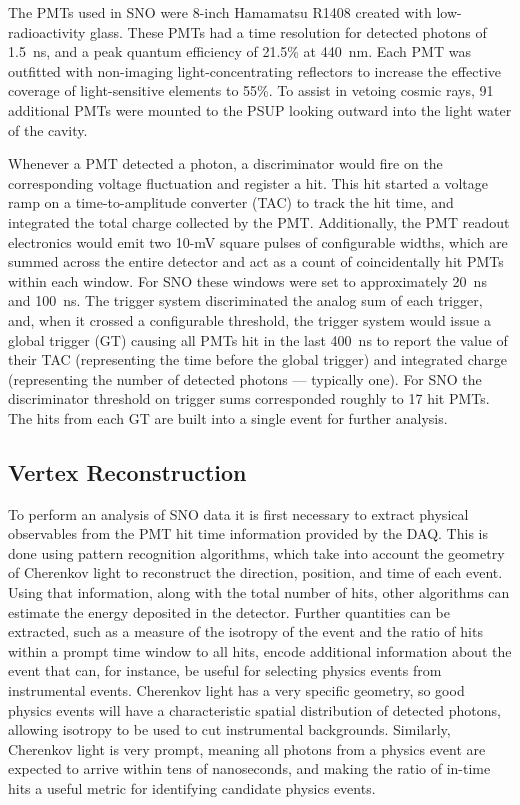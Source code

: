 The PMTs used in SNO were 8-inch Hamamatsu R1408 created with low-radioactivity glass. 
These PMTs had a time resolution for detected photons of 1.5~ns, and a peak quantum efficiency of 21.5\% at 440~nm.
Each PMT was outfitted with non-imaging light-concentrating reflectors to increase the effective coverage of light-sensitive elements to 55\%.
To assist in vetoing cosmic rays, 91 additional PMTs were mounted to the PSUP looking outward into the light water of the cavity. 

Whenever a PMT detected a photon, a discriminator would fire on the corresponding voltage fluctuation and register a hit.
This hit started a voltage ramp on a time-to-amplitude converter (TAC) to track the hit time, and integrated the total charge collected by the PMT.
Additionally, the PMT readout electronics would emit two  10-mV square pulses of configurable widths, which are summed across the entire detector and act as a count of coincidentally hit PMTs within each window.
For SNO these windows were set to approximately 20~ns and 100~ns.
The trigger system discriminated the analog sum of each trigger, and, when it crossed a configurable threshold, the trigger system would issue a global trigger (GT) causing all PMTs hit in the last 400~ns to report the value of their TAC (representing the time before the global trigger) and integrated charge (representing the number of detected photons --- typically one).
For SNO the discriminator threshold on trigger sums corresponded roughly to 17 hit PMTs.
The hits from each GT are built into a single event for further analysis.

\subsection{Vertex Reconstruction}

To perform an analysis of SNO data it is first necessary to extract physical observables from the PMT hit time information provided by the DAQ.
This is done using pattern recognition algorithms, which take into account the geometry of Cherenkov light to reconstruct the direction, position, and time of each event.
Using that information, along with the total number of hits, other algorithms can estimate the energy deposited in the detector. 
Further quantities can be extracted, such as a measure of the isotropy of the event and the ratio of hits within a prompt time window to all hits, encode additional information about the event that can, for instance, be useful for selecting physics events from instrumental events.
Cherenkov light has a very specific geometry, so good physics events will have a characteristic spatial distribution of detected photons, allowing isotropy to be used to cut instrumental backgrounds.
Similarly, Cherenkov light is very prompt, meaning all photons from a physics event are expected to arrive within tens of nanoseconds, and making the ratio of in-time hits a useful metric for identifying candidate physics events. 

